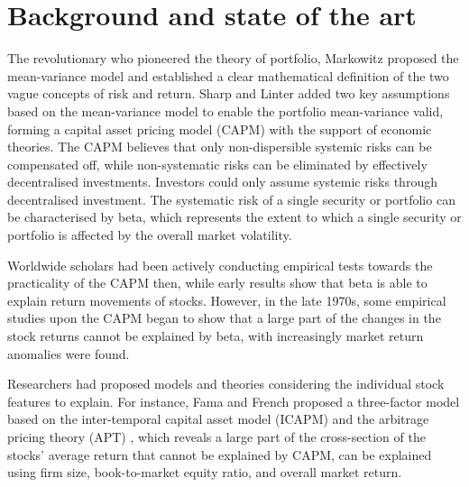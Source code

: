 \chapter[Background]{Background and state of the art}
The revolutionary who pioneered the theory of portfolio, Markowitz \cite{portfolio} proposed the mean-variance model and established a clear mathematical definition of the two vague concepts of risk and return. Sharp \cite{equilibrium} and Linter \cite{diversification} added two key assumptions based on the mean-variance model to enable the portfolio mean-variance valid, forming a capital asset pricing model (CAPM) with the support of economic theories. The CAPM believes that only non-dispersible systemic risks can be compensated off, while non-systematic risks can be eliminated by effectively decentralised investments. Investors could only assume systemic risks through decentralised investment. The systematic risk of a single security or portfolio can be characterised by beta, which represents the extent to which a single security or portfolio is affected by the overall market volatility.

Worldwide scholars had been actively conducting empirical tests towards the practicality of the CAPM then, while early results show that beta is able to explain return movements of stocks. However, in the late 1970s, some empirical studies upon the CAPM began to show that a large part of the changes in the stock returns cannot be explained by beta, with increasingly market return anomalies were found.

Researchers had proposed models and theories considering the individual stock features to explain. For instance, Fama and French \cite{riskfactors, anomalies} proposed a three-factor model based on the inter-temporal capital asset model (ICAPM) \cite{intertemporal} and the arbitrage pricing theory (APT) \cite{options}, which reveals a large part of the cross-section of the stocks’ average return that cannot be explained by CAPM, can be explained using firm size, book-to-market equity ratio, and overall market return.

